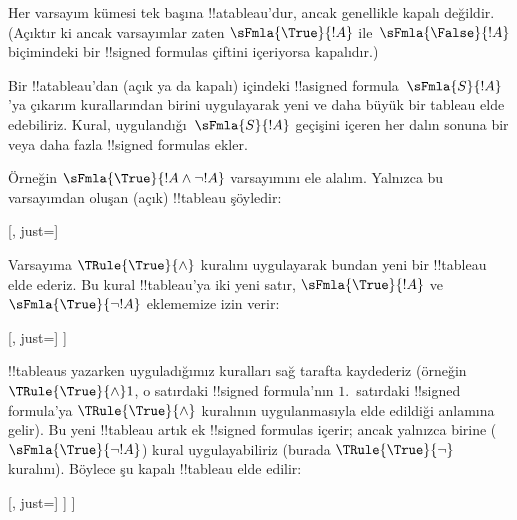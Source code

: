 \documentclass[../../../include/open-logic-section]{subfiles}
\begin{document}
\begin{ex}
  Her varsayım kümesi tek başına !!a{tableau}'dur, ancak genellikle kapalı
  değildir. (Açıktır ki ancak varsayımlar zaten
  $\sFmla{\True}{!A}$ ile~$\sFmla{\False}{!A}$ biçimindeki bir
  !!{signed formula}s çiftini içeriyorsa kapalıdır.)

  Bir !!a{tableau}'dan (açık ya da kapalı) içindeki
  !!a{signed formula}~$\sFmla{S}{!A}$'ya
  çıkarım kurallarından birini uygulayarak yeni ve daha büyük bir tableau
  elde edebiliriz. Kural, uygulandığı~$\sFmla{S}{!A}$ geçişini içeren her dalın sonuna
  bir veya daha fazla !!{signed formula}s ekler.

  Örneğin $\sFmla{\True}{!A \land \lnot !A}$ varsayımını ele alalım.
  Yalnızca bu varsayımdan oluşan (açık) !!{tableau} şöyledir:
  \begin{center}
    \begin{tableau}{}
      [, just=\TAss]
    \end{tableau}{}
  \end{center}
  Varsayıma $\TRule{\True}{\land}$ kuralını uygulayarak bundan yeni bir
  !!{tableau} elde ederiz. Bu kural !!{tableau}'ya iki yeni satır,
  $\sFmla{\True}{!A}$ ve $\sFmla{\True}{\lnot !A}$ eklememize izin verir:
  \begin{center}
    \begin{tableau}{}
      [, just=\TAss
        [\sFmla{\True}{\formula{A}}, just={\TRule{\True}{\land}[1]},
          [\sFmla{\True}{\lnot \formula{A}}, just={\TRule{\True}{\land}[1]}
          ]
        ]
      ]
    \end{tableau}{}
  \end{center}
  !!{tableau}s yazarken uyguladığımız kuralları sağ tarafta kaydederiz
  (örneğin $\TRule{\True}{\land} 1$, o satırdaki !!{signed formula}'nın
  $1$.~satırdaki !!{signed formula}'ya $\TRule{\True}{\land}$ kuralının
  uygulanmasıyla elde edildiği anlamına gelir). Bu yeni !!{tableau} artık
  ek !!{signed formula}s içerir; ancak yalnızca birine
  ($\sFmla{\True}{\lnot !A}$) kural uygulayabiliriz (burada
  $\TRule{\True}{\lnot}$ kuralını). Böylece şu kapalı !!{tableau} elde edilir:
  \begin{center}
    \begin{tableau}{}
      [, just=\TAss
        [\sFmla{\True}{\formula{A}}, just={\TRule{\True}{\land}[1]}
          [\sFmla{\True}{\lnot \formula{A}}, just={\TRule{\True}{\land}[1]}
            [\sFmla{\False}{\formula{A}}, just={\TRule{\True}{\lnot}[3]}, close]
          ]
        ]
      ]
    \end{tableau}{}
  \end{center}
\end{ex}
\end{document}
